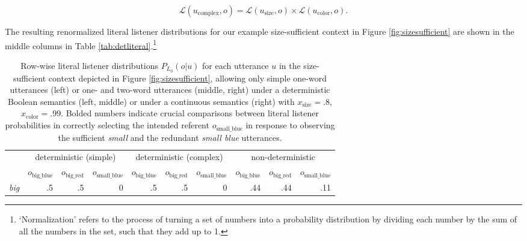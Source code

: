 \documentclass[11pt]{article}
\newcommand{\tableref}[1]{Table \ref{#1}}
\newcommand{\figref}[1]{Figure \ref{#1}}
\begin{document}
\begin{equation} 
\label{eq:prodcomp}
\mathcal{L}(u_{\text{complex}},o) = \mathcal{L}(u_{\text{size}},o) \times \mathcal{L}(u_{\text{color}},o).
\end{equation} 

The resulting renormalized literal listener distributions for our example size-sufficient context in \figref{fig:sizesufficient} are shown in the middle columns in \tableref{tab:detliteral}.\footnote{`Normalization' refers to the process of turning a set of numbers into a probability distribution by dividing each number by the sum of all the numbers in the set, such that they add up to 1.}

\begin{table}
\caption{Row-wise literal listener distributions $P_{L_0}(o | u)$ for each utterance $u$ in the size-sufficient context depicted in \figref{fig:sizesufficient}, allowing only simple one-word utterances (left) or one- and two-word utterances (middle, right) under a deterministic Boolean semantics (left, middle) or under a continuous semantics (right) with  $x_{\text{size}} = .8$, $x_{\text{color}} = .99$. Bolded numbers indicate crucial comparisons between literal listener probabilities in correctly selecting the intended referent $o_{\text{small\_blue}}$ in response to observing the sufficient \emph{small} and the redundant \emph{small blue} utterances.}
\small
\begin{tabular}{l r r r r r r r r r}
\toprule
& \multicolumn{3}{c}{deterministic (simple)} & \multicolumn{3}{c}{deterministic (complex)} & \multicolumn{3}{c}{non-deterministic}\\
& $o_{\textrm{big\_blue}}$ & $o_{\textrm{big\_red}}$ & $o_{\textrm{small\_blue}}$ & $o_{\textrm{big\_blue}}$ & $o_{\textrm{big\_red}}$ & $o_{\textrm{small\_blue}}$
& $o_{\textrm{big\_blue}}$ & $o_{\textrm{big\_red}}$ & $o_{\textrm{small\_blue}}$ \\
\midrule
\emph{big} & .5 & .5 & 0 & .5 & .5 & 0 & .44 & .44 & .11 \\

\end{tabular}
\end{table}
\end{document}
